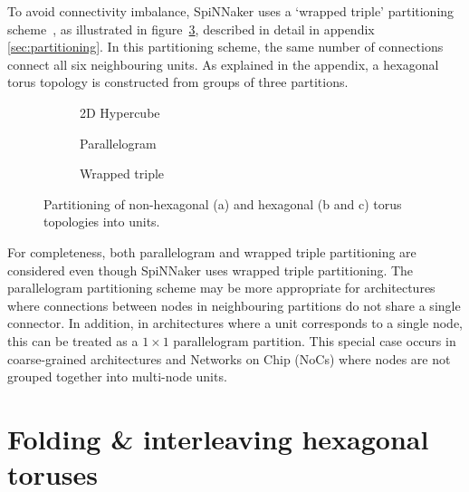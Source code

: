 		To avoid connectivity imbalance, SpiNNaker uses a `wrapped triple'
		partitioning scheme~\cite{davidsonWiring}, as illustrated in
		figure~\ref{fig:wrapped-triple-partitioning}, described in detail in
		appendix \ref{sec:partitioning}. In this partitioning scheme, the same
		number of connections connect all six neighbouring units. As explained in
		the appendix, a hexagonal torus topology is constructed from groups of
		three partitions.
		
		\begin{figure}
			\center
			\begin{subfigure}[b]{0.32\textwidth}
				\center
				\caption{2D Hypercube}
				\label{fig:hypercube-partitioning}
			\end{subfigure}
			\begin{subfigure}[b]{0.32\textwidth}
				\center
				\caption{Parallelogram}
				\label{fig:parallelogram-partitioning}
			\end{subfigure}
			\begin{subfigure}[b]{0.32\textwidth}
				\center
				\caption{Wrapped triple}
				\label{fig:wrapped-triple-partitioning}
			\end{subfigure}
			
			\caption[Partitioning of torus topologies into units.]%
			{Partitioning of non-hexagonal (a) and hexagonal (b and c) torus
			topologies into units.}
			\label{fig:partitioning-options}
		\end{figure}
		
		For completeness, both parallelogram and wrapped triple partitioning are
		considered even though SpiNNaker uses wrapped triple partitioning. The
		parallelogram partitioning scheme may be more appropriate for architectures
		where connections between nodes in neighbouring partitions do not share a
		single connector. In addition, in architectures where a unit corresponds to
		a single node, this can be treated as a $1 \times 1$ parallelogram
		partition.  This special case occurs in coarse-grained architectures and
		Networks on Chip (NoCs) where nodes are not grouped together into
		multi-node units.
	
	\section{Folding \& interleaving hexagonal toruses}
		
